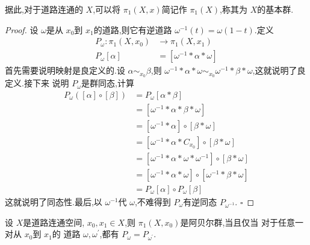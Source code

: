 \documentclass[../../几何与拓扑.tex]{subfiles}
\begin{document}
\begin{remark}
    据此,对于道路连通的  \(  X  \),可以将 \(  \pi _1 \left( X,x \right)   \)简记作 \(  \pi _1 \left( X \right)   \),称其为 \(  X  \)的基本群.
    
    
\end{remark}
\begin{proof}

    设 \(   \omega  \)是从 \(  x_0  \)到 \(  x_1  \)的道路,则它有逆道路 \(   \omega ^{-1} \left( t \right)=   \omega \left( 1-t \right)    \).定义 \[
    \begin{aligned}
    P_{ \omega }: \pi _1 \left( X,x_0 \right)&\to \pi _1 \left( X,x_1 \right)\\ 
        P_{ \omega }[\alpha ] & =  [ \omega ^{-1} *\alpha * \omega ]
    \end{aligned}
    \]    
    首先需要说明映射是良定义的.设 \(  \alpha \sim _{x_0}\beta   \),则 \(   \omega ^{-1} * \alpha * \omega  \sim _{x_0}  \omega ^{-1} *\beta * \omega   \),这就说明了良定义.接下来
    说明 \(  P_{ \omega }  \)是群同态,计算 \[
    \begin{aligned}
    P_{ \omega }\left( [ \alpha ]\circ [\beta ]  \right) & =  P_{ \omega }[ \alpha *\beta ]\\ 
     & =  [ \omega ^{-1} *\alpha *\beta * \omega ]\\ 
      & =  [ \omega ^{-1} *\alpha ]\circ [\beta * \omega ]\\ 
       & = [ \omega ^{-1} *\alpha *C_{x_0}]\circ [\beta * \omega ]\\ 
        & =  [ \omega ^{-1} *\alpha * \omega * \omega ^{-1} ]\circ [\beta * \omega ]\\ 
         &=  [ \omega ^{-1} *\alpha * \omega ]\circ [ \omega ^{-1} *\beta * \omega ]\\ 
          & =  P_{ \omega }[ \alpha ]\circ P_{ \omega }[\beta ]  
    \end{aligned}
    \]   这就说明了同态性.最后,以 \(   \omega ^{-1}   \)代 \(   \omega   \),不难得到 \(  P_{ \omega }  \)有逆同态 \(  P_{ \omega ^{-1} }  \).    
    \hfill $\square$
\end{proof}

\begin{proposition}
    设 \(  X  \)是道路连通空间, \(  x_0,x_1 \in X  \),则 \(  \pi _1 \left( X,x_0 \right)   \)是阿贝尔群,当且仅当
    对于任意一对从 \(  x_0  \)到 \(  x_1  \)的  道路 \(   \omega , \omega ^{\prime}   \),都有 \(  P_{ \omega }= P_{ \omega ^{\prime} }  \).     
\end{proposition}
\end{document}

